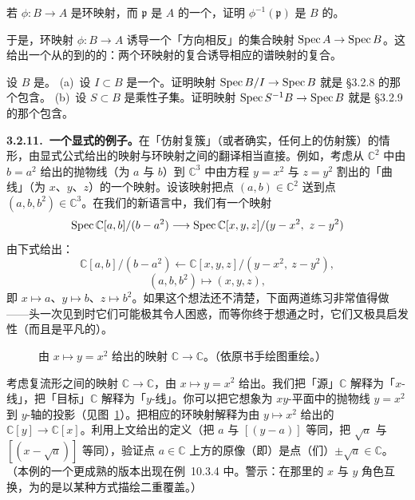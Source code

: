 \begin{exercise}[重要而容易的练习]\label{ex:preimage-of-prime-ideal}
若 $\phi\colon B\to A$ 是环映射，而 $\mathfrak{p}$ 是 $A$ 的一个\trPrimeIdeal，证明 $\phi^{-1}(\mathfrak{p})$ 是 $B$ 的\trPrimeIdeal。
\end{exercise}

于是，环映射 $\phi\colon B\to A$ 诱导一个「方向相反」的集合映射 $\operatorname{Spec} A\to\operatorname{Spec} B$。这给出一个从\trRing{}的\trCategory{}到\trSet{}的\trCategory{}的\trContravariantFunctor：两个环映射的复合诱导相应的谱映射的复合。

\begin{exercise}\label{ex:inclusion-quotient-localization}
设 $B$ 是\trRing。
(a)~设 $I\subset B$ 是一个\trIdeal。证明映射 $\operatorname{Spec} B/I\to\operatorname{Spec} B$ 就是 \S3.2.8 的那个包含。
(b)~设 $S\subset B$ 是乘性子集。证明映射 $\operatorname{Spec} S^{-1}B\to\operatorname{Spec} B$ 就是 \S3.2.9 的那个包含。
\end{exercise}

\textbf{3.2.11.\ 一个显式的例子。}\quad 在「仿射复簇」（或者确实，任何\trAlgClosedField{}上的仿射簇）的情形，由显式公式给出的映射与环映射之间的翻译相当直接。例如，考虑从 $\mathbb{C}^2$ 中由 $b=a^2$ 给出的抛物线（\trCoordinate{}为 $a$ 与 $b$）到 $\mathbb{C}^3$ 中由方程 $y=x^2$ 与 $z=y^2$ 割出的「曲线」（\trCoordinate{}为 $x$、$y$、$z$）的一个映射。设该映射把点 $(a,b)\in\mathbb{C}^2$ 送到点 $(a,b,b^2)\in\mathbb{C}^3$。在我们的新语言中，我们有一个映射
\[
\Spec \mathbb{C}[a,b]/(b-a^2)\longrightarrow \Spec \mathbb{C}[x,y,z]/(y-x^2,\ z-y^2)
\]
由下式给出：
\[
\mathbb{C}[a,b]/(b-a^2)\longleftarrow\mathbb{C}[x,y,z]/(y-x^2,\ z-y^2),
\]
\[
(a,b,b^2)\longmapsto(x,y,z),
\]
即 $x\mapsto a$、$y\mapsto b$、$z\mapsto b^2$。如果这个想法还不清楚，下面两道练习非常值得做——头一次见到时它们可能极其令人困惑，而等你终于想通之时，它们又极具启发性（而且是平凡的）。

\begin{figure}[htbp]
\centering
{}
\caption{由 $x\mapsto y=x^2$ 给出的映射 $\mathbb{C}\to\mathbb{C}$。（依原书手绘图重绘。）}\label{fig:parabola-map}
\end{figure}

\begin{exercise}[重要练习：特例]\label{ex:parabola-projection-special-case}
考虑复流形之间的映射 $\mathbb{C}\to\mathbb{C}$，由 $x\mapsto y=x^2$ 给出。我们把「源」$\mathbb{C}$ 解释为「$x$-线」，把「目标」$\mathbb{C}$ 解释为「$y$-线」。你可以把它想象为 $xy$-平面中的抛物线 $y=x^2$ 到 $y$-轴的投影（见图~\ref{fig:parabola-map}）。把相应的环映射解释为由 $y\mapsto x^2$ 给出的 $\mathbb{C}[y]\to\mathbb{C}[x]$。利用上文给出的定义（把 $a$ 与 $[(y-a)]$ 等同，把 $\sqrt{a}$ 与 $[(x-\sqrt{a})]$ 等同），验证点 $a\in\mathbb{C}$ 上方的原像（即\trFiber）是点（们）$\pm\sqrt{a}\in\mathbb{C}$。（本例的一个更成熟的版本出现在例~10.3.4 中。警示：在那里的 $x$ 与 $y$ 角色互换，为的是以某种方式描绘二重覆盖。）
\end{exercise}

